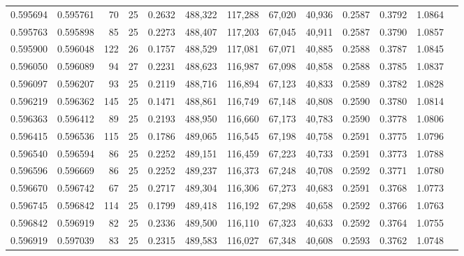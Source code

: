 \begin{tabular}{rrrrrrrrrrrrr}
0.595694 & 0.595761 &  70 &  25 &                                     0.2632 & 488,322 & 117,288 &  67,020 &  40,936 & 0.2587 & 0.3792 & 1.0864 \\
0.595763 & 0.595898 &  85 &  25 &                                     0.2273 & 488,407 & 117,203 &  67,045 &  40,911 & 0.2587 & 0.3790 & 1.0857 \\
0.595900 & 0.596048 & 122 &  26 &                                     0.1757 & 488,529 & 117,081 &  67,071 &  40,885 & 0.2588 & 0.3787 & 1.0845 \\
0.596050 & 0.596089 &  94 &  27 &                                     0.2231 & 488,623 & 116,987 &  67,098 &  40,858 & 0.2588 & 0.3785 & 1.0837 \\
0.596097 & 0.596207 &  93 &  25 &                                     0.2119 & 488,716 & 116,894 &  67,123 &  40,833 & 0.2589 & 0.3782 & 1.0828 \\
0.596219 & 0.596362 & 145 &  25 &                                     0.1471 & 488,861 & 116,749 &  67,148 &  40,808 & 0.2590 & 0.3780 & 1.0814 \\
0.596363 & 0.596412 &  89 &  25 &                                     0.2193 & 488,950 & 116,660 &  67,173 &  40,783 & 0.2590 & 0.3778 & 1.0806 \\
0.596415 & 0.596536 & 115 &  25 &                                     0.1786 & 489,065 & 116,545 &  67,198 &  40,758 & 0.2591 & 0.3775 & 1.0796 \\
0.596540 & 0.596594 &  86 &  25 &                                     0.2252 & 489,151 & 116,459 &  67,223 &  40,733 & 0.2591 & 0.3773 & 1.0788 \\
0.596596 & 0.596669 &  86 &  25 &                                     0.2252 & 489,237 & 116,373 &  67,248 &  40,708 & 0.2592 & 0.3771 & 1.0780 \\
0.596670 & 0.596742 &  67 &  25 &                                     0.2717 & 489,304 & 116,306 &  67,273 &  40,683 & 0.2591 & 0.3768 & 1.0773 \\
0.596745 & 0.596842 & 114 &  25 &                                     0.1799 & 489,418 & 116,192 &  67,298 &  40,658 & 0.2592 & 0.3766 & 1.0763 \\
0.596842 & 0.596919 &  82 &  25 &                                     0.2336 & 489,500 & 116,110 &  67,323 &  40,633 & 0.2592 & 0.3764 & 1.0755 \\
0.596919 & 0.597039 &  83 &  25 &                                     0.2315 & 489,583 & 116,027 &  67,348 &  40,608 & 0.2593 & 0.3762 & 1.0748 \\

\end{tabular}
